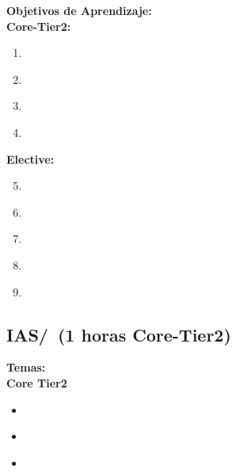\noindent \textbf{Objetivos de Aprendizaje:}\\
\noindent \textbf{Core-Tier2:}
\begin{enumerate}
	\setcounter{enumi}{0}
	\item \IASNetworkSecurityLODescribeTheOfAnd\xspace[\IASNetworkSecurityLODescribeTheOfAndLevel]\label{sec:BOK:IASNetworkSecurityLODescribeTheOfAnd}
	\item \IASNetworkSecurityLODescribeThePublic\xspace[\IASNetworkSecurityLODescribeThePublicLevel]\label{sec:BOK:IASNetworkSecurityLODescribeThePublic}
	\item \IASNetworkSecurityLODescribeVirtues\xspace[\IASNetworkSecurityLODescribeVirtuesLevel]\label{sec:BOK:IASNetworkSecurityLODescribeVirtues}
	\item \IASNetworkSecurityLOIdentifyTheMechanism\xspace[\IASNetworkSecurityLOIdentifyTheMechanismLevel]\label{sec:BOK:IASNetworkSecurityLOIdentifyTheMechanism}
\end{enumerate}
\noindent \textbf{Elective:}
\begin{enumerate}
	\setcounter{enumi}{4}
	\item \IASNetworkSecurityLODiscussSecurity\xspace[\IASNetworkSecurityLODiscussSecurityLevel]\label{sec:BOK:IASNetworkSecurityLODiscussSecurity}
	\item \IASNetworkSecurityLOIdentifyTheFaced\xspace[\IASNetworkSecurityLOIdentifyTheFacedLevel]\label{sec:BOK:IASNetworkSecurityLOIdentifyTheFaced}
	\item \IASNetworkSecurityLODescribeThreats\xspace[\IASNetworkSecurityLODescribeThreatsLevel]\label{sec:BOK:IASNetworkSecurityLODescribeThreats}
	\item \IASNetworkSecurityLOSummarizeDefenses\xspace[\IASNetworkSecurityLOSummarizeDefensesLevel]\label{sec:BOK:IASNetworkSecurityLOSummarizeDefenses}
	\item \IASNetworkSecurityLODiagram\xspace[\IASNetworkSecurityLODiagramLevel]\label{sec:BOK:IASNetworkSecurityLODiagram}
\end{enumerate}


\subsection{IAS/\IASCryptography~(1 horas Core-Tier2)}\label{sec:BOK:IASCryptography}
\noindent \textbf{Temas:}\\
\noindent \textbf{Core Tier2}
\begin{itemize}
	\item \IASCryptographyTopicBasic\label{sec:BOK:IASCryptographyTopicBasic}
	\item \IASCryptographyTopicCipher\label{sec:BOK:IASCryptographyTopicCipher}
	\item \IASCryptographyTopicPublic\label{sec:BOK:IASCryptographyTopicPublic}
\end{itemize}

